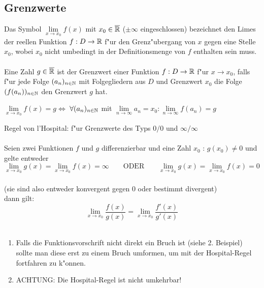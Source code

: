\subsection{Grenzwerte}

\begin{Definition}
Das Symbol $\lim\limits_{x \rightarrow x_{0}}f(x)$ mit $x_{0} \in \overline{\mathbb{R}}$ ($\pm \infty$ eingeschlossen) bezeichnet den Limes der reellen Funktion $f:D\rightarrow \mathbb{R}$ f"ur den Grenz"ubergang von $x$ gegen eine Stelle $x_{0}$, wobei $x_{0}$ nicht umbedingt in der Definitionsmenge von $f$ enthalten sein muss.\\
\\
Eine Zahl $g \in \overline{\mathbb{R}}$ ist der Grenzwert einer Funktion $f:D\rightarrow \mathbb{R}$ f"ur $x\rightarrow x_{0}$, falls f"ur jede Folge $(a_{n})_{n\in \mathbb{N}}$ mit Folgegliedern aus $D$ und Grenzwert $x_{0}$ die Folge $(f(a_{n}))_{n\in \mathbb{N}}$ den Grenzwert $g$ hat.
\begin{center}
$\lim\limits_{x \rightarrow x_{0}}f(x) = g $\quad $\Leftrightarrow$ \quad $\forall (a_{n})_{n\in \mathbb{N}}$ mit $\lim\limits_{n \rightarrow \infty}a_{n}=x_{0} : \lim\limits_{n \rightarrow \infty}f(a_{n})=g$
\end{center}
\end{Definition}

\begin{Definition}
Regel von l'Hospital: f"ur Grenzwerte des Typs $0/0$ und $\infty/\infty$\\\\
Seien zwei Funktionen $f$ und $g$ differenzierbar und eine Zahl $x_{0}$ : $g(x_{0})\neq0$ und gelte entweder\\
$$\lim\limits_{x \rightarrow x_{0}}g(x) = \lim\limits_{x \rightarrow x_{0}}f(x) = \infty \qquad \text{ODER} \qquad  \lim\limits_{x \rightarrow x_{0}}g(x) = \lim\limits_{x \rightarrow x_{0}}f(x) = 0$$\\
(sie sind also entweder konvergent gegen $0$ oder bestimmt divergent) \\dann gilt:\\
$$\lim\limits_{x \rightarrow x_{0}} \dfrac{f(x)}{g(x)} = \lim\limits_{x \rightarrow x_{0}}\dfrac{f'(x)}{g'(x)}$$\\
\end{Definition}

\begin{Bemerkung}
\begin{enumerate}
\item Falls die Funktionsvorschrift nicht direkt ein Bruch ist (siehe 2. Beispiel) sollte man diese erst zu einem Bruch umformen, um mit der Hospital-Regel fortfahren zu k"onnen.
\item ACHTUNG: Die Hospital-Regel ist nicht umkehrbar!
\end{enumerate}
\end{Bemerkung}

